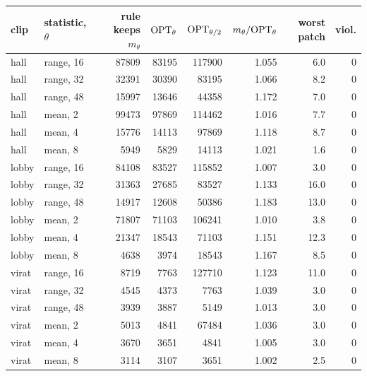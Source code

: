 \begin{tabular}{llrrrrrr}
\toprule
clip & statistic, $\theta$ & rule keeps $m_\theta$ & $\mathrm{OPT}_\theta$ & $\mathrm{OPT}_{\theta/2}$ & $m_\theta/\mathrm{OPT}_\theta$ & worst patch & viol. \\
\midrule
hall & range, 16 & 87809 & 83195 & 117900 & 1.055 & 6.0 & 0 \\
hall & range, 32 & 32391 & 30390 & 83195 & 1.066 & 8.2 & 0 \\
hall & range, 48 & 15997 & 13646 & 44358 & 1.172 & 7.0 & 0 \\
hall & mean, 2 & 99473 & 97869 & 114462 & 1.016 & 7.7 & 0 \\
hall & mean, 4 & 15776 & 14113 & 97869 & 1.118 & 8.7 & 0 \\
hall & mean, 8 & 5949 & 5829 & 14113 & 1.021 & 1.6 & 0 \\
lobby & range, 16 & 84108 & 83527 & 115852 & 1.007 & 3.0 & 0 \\
lobby & range, 32 & 31363 & 27685 & 83527 & 1.133 & 16.0 & 0 \\
lobby & range, 48 & 14917 & 12608 & 50386 & 1.183 & 13.0 & 0 \\
lobby & mean, 2 & 71807 & 71103 & 106241 & 1.010 & 3.8 & 0 \\
lobby & mean, 4 & 21347 & 18543 & 71103 & 1.151 & 12.3 & 0 \\
lobby & mean, 8 & 4638 & 3974 & 18543 & 1.167 & 8.5 & 0 \\
virat & range, 16 & 8719 & 7763 & 127710 & 1.123 & 11.0 & 0 \\
virat & range, 32 & 4545 & 4373 & 7763 & 1.039 & 3.0 & 0 \\
virat & range, 48 & 3939 & 3887 & 5149 & 1.013 & 3.0 & 0 \\
virat & mean, 2 & 5013 & 4841 & 67484 & 1.036 & 3.0 & 0 \\
virat & mean, 4 & 3670 & 3651 & 4841 & 1.005 & 3.0 & 0 \\
virat & mean, 8 & 3114 & 3107 & 3651 & 1.002 & 2.5 & 0 \\
\bottomrule
\end{tabular}
